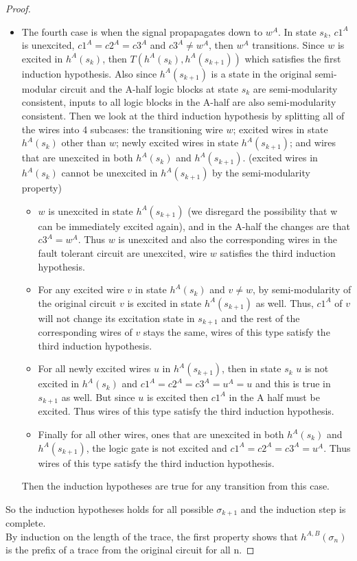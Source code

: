 \documentclass[12pt]{report}
\begin{document}
\begin{proof}
\begin{itemize}
\item The fourth case is when the signal propapagates down to $w^A$.  In state $s_k$, $c1^A$ is unexcited, $c1^A=c2^A=c3^A$ and $c3^A\neq w^A$, then $w^A$ transitions.  Since $w$ is excited in $h^A(s_k)$, then $T(h^A(s_k), h^A(s_{k+1}))$ which satisfies the first induction hypothesis.  Also since $h^A(s_{k+1})$ is a state in the original semi-modular circuit and the A-half logic blocks at state $s_k$ are semi-modularity consistent, inputs to all logic blocks in the A-half are also semi-modularity consistent. Then we look at the third induction hypothesis by splitting all of the wires into 4 subcases: the transitioning wire $w$; excited wires in state $h^A(s_k)$ other than $w$; newly excited wires in state $h^A(s_{k+1})$; and wires that are unexcited in both $h^A(s_k)$ and $h^A(s_{k+1})$.  (excited wires in $h^A(s_k)$ cannot be unexcited in $h^A(s_{k+1})$ by the semi-modularity property)  
\begin{itemize}
\item
$w$ is unexcited in state $h^A(s_{k+1})$ (we disregard the possibility that w can be immediately excited again), and in the A-half the changes are that $c3^{A}= w^{A}$.  Thus $w$ is unexcited and also the corresponding wires in the fault tolerant circuit are unexcited, wire $w$ satisfies the third induction hypothesis.  
\item
For any excited wire $v$ in state $h^A(s_k)$ and $v\neq w$, by semi-modularity of the original circuit $v$ is excited in state $h^A(s_{k+1})$ as well.  Thus, $c1^A$ of $v$ will not change its excitation state in $s_{k+1}$ and the rest of the corresponding wires of $v$ stays the same, wires of this type satisfy the third induction hypothesis.  
\item
For all newly excited wires $u$ in $h^A(s_{k+1})$, then in state $s_{k}$ $u$ is not excited in $h^A(s_k)$ and $c1^A=c2^A=c3^A=u^A=u$ and this is true in $s_{k+1}$ as well.  But since $u$ is excited then $c1^A$ in the A half must be excited.  Thus wires of this type satisfy the third induction hypothesis. 
\item
Finally for all other wires, ones that are unexcited in both $h^A(s_k)$ and $h^A(s_{k+1})$, the logic gate is not excited and $c1^A=c2^A=c3^A=u^A$.  Thus wires of this type satisfy the third induction hypothesis.  
\end{itemize}
Then the induction hypotheses are true for any transition from this case. 
\end{itemize}
So the induction hypotheses holds for all possible $\sigma_{k+1}$ and the induction step is complete. \\
By induction on the length of the trace, the first property shows that $h^{A,B}(\sigma_n)$ is the prefix of a trace from the original circuit for all n.


\end{proof}
\end{document}

